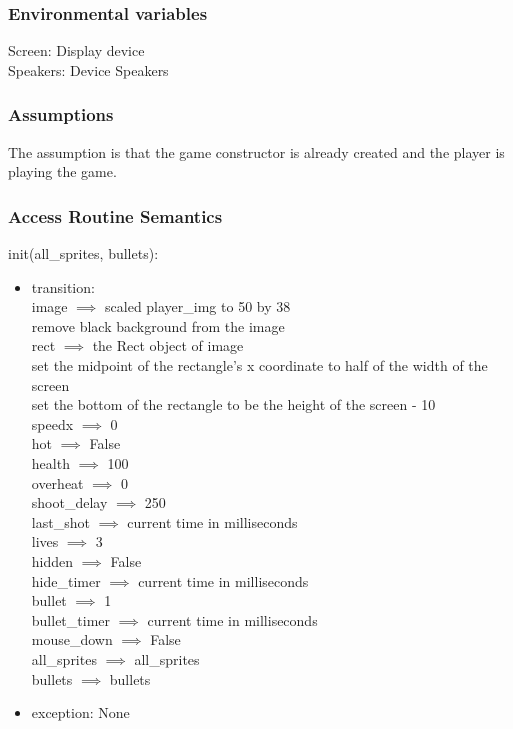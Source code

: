 \documentclass[12pt, titlepage]{article}
\begin{document}
\subsubsection {Environmental variables}
Screen: Display device\\
Speakers: Device Speakers

\subsubsection {Assumptions}
The assumption is that the game constructor is already created and the player is playing the game.

\subsubsection {Access Routine Semantics}

\noindent init(all\_sprites, bullets): 
\begin{itemize}
\item transition: \\
image $\implies$ scaled player\_img to 50 by 38\\
remove black background from the image\\
rect $\implies$ the Rect object of image\\
set the midpoint of the rectangle's x coordinate to half of the width of the screen\\
set the bottom of the rectangle to be the height of the screen - 10\\
speedx $\implies$ 0\\
hot $\implies$ False\\
health $\implies$ 100\\
overheat $\implies$ 0\\
shoot\_delay $\implies$ 250\\
last\_shot $\implies$ current time in milliseconds\\
lives $\implies$ 3\\
hidden $\implies$ False\\
hide\_timer $\implies$ current time in milliseconds\\
bullet $\implies$ 1\\
bullet\_timer $\implies$ current time in milliseconds\\
mouse\_down $\implies$ False\\
all\_sprites $\implies$ all\_sprites\\
bullets $\implies$ bullets\\
\item exception: None
\end{itemize}
\end{document}
